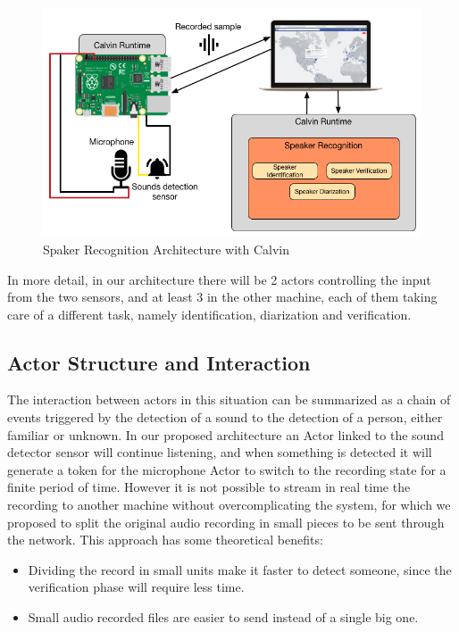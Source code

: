 \begin{figure}[h]
\caption{Spaker Recognition Architecture with Calvin}
\label{fig:calvin-spkr1}
\centering
\includegraphics[scale=0.50]{calvin-speaker1.png}
\end{figure}

In more detail, in our architecture there will be 2 actors controlling the input from
the two sensors, and at least 3 in the other machine, each of them taking care of a different
task, namely identification, diarization and verification.

\subsection{Actor Structure and Interaction}

The interaction between actors in this situation can be summarized as a chain
of events triggered by the detection of a sound to the detection of a person, either
familiar or unknown. In our proposed architecture an Actor linked to the sound detector sensor
will continue listening, and when something is detected it will generate a token for the microphone Actor
to switch to the recording state for a finite period of time. However it is not possible to stream in real time the recording
to another machine without overcomplicating the system, for which we proposed to split the original
audio recording in small pieces to be sent through the network. This approach has some theoretical benefits:

\begin{itemize}
    \item Dividing the record in small units make it faster to detect someone, since the
    verification phase will require less time.
    \item Small audio recorded files are easier to send instead of a single big one.
\end{itemize}

